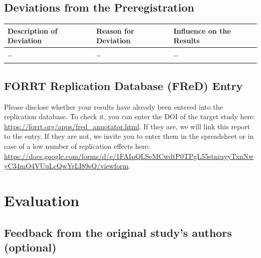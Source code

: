 \documentclass[
  letterpaper,
  DIV=11,
  numbers=noendperiod]{scrartcl}
\begin{document}
\subsection{Deviations from the
Preregistration}\label{deviations-from-the-preregistration}

\begin{longtable}[]{@{}
  >{\raggedright\arraybackslash}p{}
  >{\raggedright\arraybackslash}p{}
  >{\raggedright\arraybackslash}p{}@{}}
\toprule\noalign{}
\begin{minipage}[b]{\linewidth}\raggedright
Description of Deviation
\end{minipage} & \begin{minipage}[b]{\linewidth}\raggedright
Reason for Deviation
\end{minipage} & \begin{minipage}[b]{\linewidth}\raggedright
Influence on the Results
\end{minipage} \\
\midrule\noalign{}
\endhead
\bottomrule\noalign{}
\endlastfoot
\ldots{} & \ldots{} & \ldots{} \\
& & \\
\end{longtable}

\subsection{FORRT Replication Database (FReD)
Entry}\label{forrt-replication-database-fred-entry}

Please disclose whether your results have already been entered into the
replication database. To check it, you can enter the DOI of the target
study here: \url{https://forrt.org/apps/fred_annotator.html}. If they
are, we will link this report to the entry. If they are not, we invite
you to enter them in the spreadsheet or in case of a low number of
replication effects here:
\url{https://docs.google.com/forms/d/e/1FAIpQLSeMCwdtP0TPgL55stniuyyTxnNwyC34mO4VUuLcQwYrLI89sQ/viewform}.

\section{Evaluation}\label{evaluation}

\subsection{Feedback from the original study's authors
(optional)}\label{feedback-from-the-original-studys-authors-optional}
\end{document}
